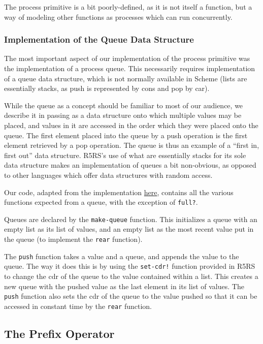 \documentclass{article}
\begin{document}
The process primitive is a bit poorly-defined, as it is not itself a
function, but a way of modeling other functions as processes which can
run concurrently.

\subsubsection*{Implementation of the Queue Data Structure}

The most important aspect of our implementation of the process primitive
was the implementation of a process queue. This necessarily requires 
implementation of a queue data structure, which is not normally available
in Scheme (lists are essentially stacks, as push is represented by cons
and pop by car).

While the queue as a concept should be familiar to most of our audience,
we describe it in passing as a data structure onto which multiple values
may be placed, and values in it are accessed in the order which they were
placed onto the queue. The first element placed into the queue by a push
operation is the first element retrieved by a pop operation. The queue
is thus an example of a ``first in, first out'' data structure. R5RS's
use of what are essentially stacks for its sole data structure makes 
an implementation of queues a bit non-obvious, as opposed to other 
languages which offer data structures with random access.

Our code, adapted from the implementation \href{http://yazary.blogspot.com/2012/02/implementing-queue-in-scheme_22.html}{here}, contains all the various functions expected from a queue, with
the exception of \texttt{full?}.

Queues are declared by the \texttt{make-queue} function. This initializes
a queue with an empty list as its list of values, and an empty list as the
most recent value put in the queue (to implement the \texttt{rear} 
function).

The \texttt{push} function takes a value and a queue, and appends the
value to the queue. The way it does this is by using the \texttt{set-cdr!}
function provided in R5RS to change the cdr of the queue to the value
contained within a list. This creates a new queue with the pushed value
as the last element in its list of values. The \texttt{push} function also
sets the cdr of the queue to the value pushed so that it can be accessed
in constant time by the \texttt{rear} function.

\subsection*{The Prefix Operator}
\end{document}
